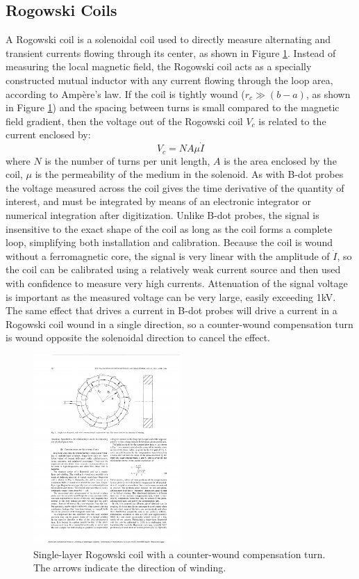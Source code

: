 \documentclass{jpp}
\begin{document}
\subsection{Rogowski Coils}

A Rogowski coil is a solenoidal coil used to directly measure alternating and transient currents flowing through its center, as shown in Figure \ref{fig:rogowski}. Instead of measuring the local magnetic field, the Rogowski coil acts as a specially constructed mutual inductor with any current flowing through the loop area, according to Ampère's law. If the coil is tightly wound ($r_c \gg (b - a)$, as shown in Figure \ref{fig:rogowski}) and the spacing between turns is small compared to the magnetic field gradient, then the voltage out of the Rogowski coil $V_c$ is related to the current enclosed by:
\begin{equation*}
V_c = N A \mu \dot I
\end{equation*}
where $N$ is the number of turns per unit length, $A$ is the area enclosed by the coil, $\mu$ is the permeability of the medium in the solenoid. As with B-dot probes the voltage measured across the coil gives the time derivative of the quantity of interest, and must be integrated by means of an electronic integrator or numerical integration after digitization. Unlike B-dot probes, the signal is insensitive to the exact shape of the coil as long as the coil forms a complete loop, simplifying both installation and calibration. Because the coil is wound without a ferromagnetic core, the signal is very linear with the amplitude of $\dot{I}$, so the coil can be calibrated using a relatively weak current source and then used with confidence to measure very high currents. Attenuation of the signal voltage is important as the measured voltage can be very large, easily exceeding 1kV. The same effect that drives a current in B-dot probes will drive a current in a Rogowski coil wound in a single direction, so a counter-wound compensation turn is wound opposite the solenoidal direction to cancel the effect.

\begin{figure}
  \centering
  \includegraphics[width=0.5\textwidth]{rogowski.pdf}%
  \caption{Single-layer Rogowski coil with a counter-wound compensation turn. The arrows indicate the direction of winding. \citep{492777}}
\label{fig:rogowski}
\end{figure}
\end{document}
